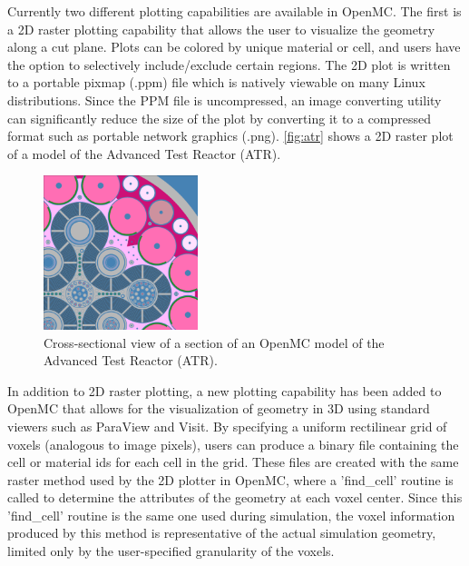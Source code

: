 \documentclass{snamc2013}
\begin{document}
Currently two different plotting capabilities are available in OpenMC. The first
is a 2D raster plotting capability that allows the user to visualize the
geometry along a cut plane. Plots can be colored by unique material or cell, and
users have the option to selectively include/exclude certain regions. The 2D
plot is written to a portable pixmap (.ppm) file which is natively viewable on
many Linux distributions. Since the PPM file is uncompressed, an image
converting utility can significantly reduce the size of the plot by converting
it to a compressed format such as portable network graphics
(.png). \autoref{fig:atr} shows a 2D raster plot of a model of the Advanced Test
Reactor (ATR).
\begin{figure}[htb]
  \centering
  \includegraphics[width=0.4\textwidth]{images/atr.png}
  \caption{Cross-sectional view of a section of an OpenMC model of the Advanced
    Test Reactor (ATR).}
  \label{fig:atr}
\end{figure}

In addition to 2D raster plotting, a new plotting capability has been added to
OpenMC that allows for the visualization of geometry in 3D using standard
viewers such as ParaView and Visit. By specifying a uniform rectilinear grid of
voxels (analogous to image pixels), users can produce a binary file containing
the cell or material ids for each cell in the grid.  These files are created
with the same raster method used by the 2D plotter in OpenMC, where a
'find\_cell' routine is called to determine the attributes of the geometry at
each voxel center.  Since this 'find\_cell' routine is the same one used during
simulation, the voxel information produced by this method is representative of
the actual simulation geometry, limited only by the user-specified granularity
of the voxels.
\end{document}

